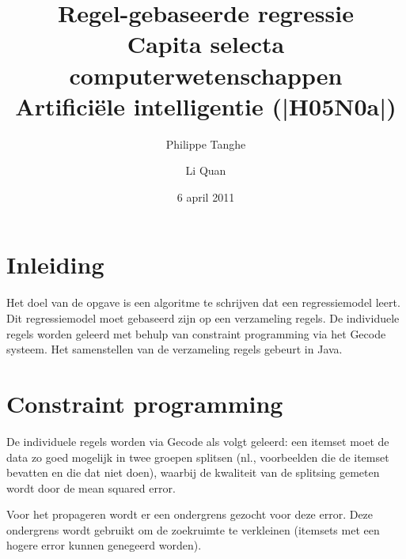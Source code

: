 \documentclass[a4paper,dutch,11pt,]{article}
\title{Regel-gebaseerde regressie\\\small{Capita selecta computerwetenschappen\\ Artificiële intelligentie (|H05N0a|)}}
\author{Philippe Tanghe \and Li Quan}
\date{6 april 2011}
\begin{document}
 
\maketitle


\tableofcontents
\clearpage

\section{Inleiding}
Het doel van de opgave is een algoritme te schrijven dat een regressiemodel leert. Dit regressiemodel moet gebaseerd zijn op een verzameling regels. De individuele regels worden geleerd met behulp van constraint programming via het Gecode systeem.
Het samenstellen van de verzameling regels gebeurt in Java.


\section{Constraint programming}
De individuele regels worden via Gecode als volgt geleerd: een itemset moet de data zo goed mogelijk in twee groepen splitsen (nl., voorbeelden die de itemset bevatten en die dat niet doen), waarbij de kwaliteit van de splitsing gemeten wordt door de mean squared error. 

Voor het propageren wordt er een ondergrens gezocht voor deze error. Deze ondergrens wordt gebruikt om de zoekruimte te verkleinen (itemsets met een hogere error kunnen genegeerd worden).





\end{document}
